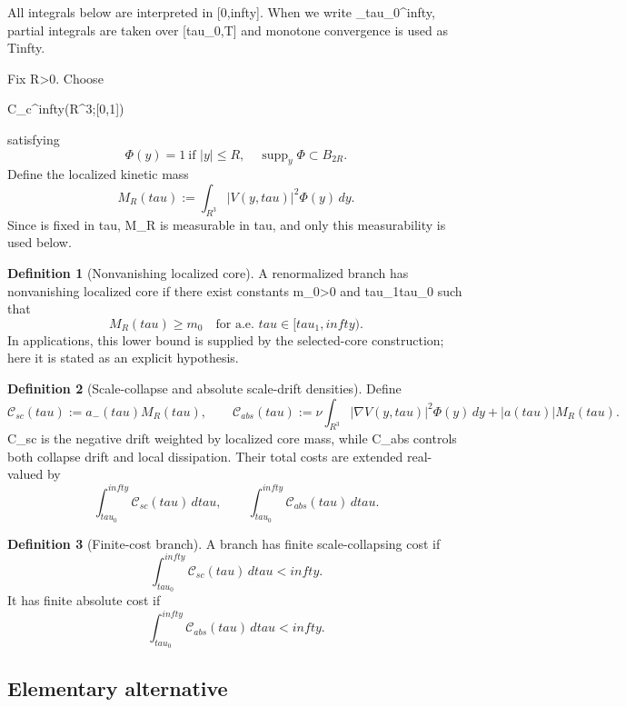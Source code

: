 \documentclass[11pt]{amsart}
\def\({}%
\def\){}%
\def\mathrm#1{#1}%
\def\mathbb#1{#1}%
\def\tau{tau}%
\def\infty{infty}%
\theoremstyle{plain}
\theoremstyle{definition}
\newtheorem{definition}[definition]{Definition}
\theoremstyle{remark}
\begin{document}
All integrals below are interpreted in \([0,\infty]\). When we write
\(\int_{\tau_0}^{\infty}\), partial integrals are taken over \([\tau_0,T]\) and
monotone convergence is used as \(T\to\infty\).

Fix \(R>0\).  Choose
\(
  \Phi\in C_c^\infty(\mathbb R^3;[0,1])
\)
satisfying
\begin{equation}\label{paper5:eq:Phi-properties}
  \Phi(y)=1\ \text{if }|y|\le R,
  \quad
  \operatorname{supp}_y\Phi\subset B_{2R}.
\end{equation}
Define the localized kinetic mass
\[
  M_R(\tau):=\int_{\mathbb R^3}|V(y,\tau)|^2\Phi(y)
  \,dy.
\]
Since \(\Phi\) is fixed in \(\tau\), \(M_R\) is measurable in \(\tau\), and only this
measurability is used below.

\begin{definition}[Nonvanishing localized core]
A renormalized branch has nonvanishing localized core if there exist
constants \(m_0>0\) and \(\tau_1\ge\tau_0\) such that
\[
  M_R(\tau)\ge m_0\quad\text{for a.e. }\tau\in[\tau_1,\infty).
\]
In applications, this lower bound is supplied by the selected-core construction; here it is stated as an explicit hypothesis.
\end{definition}

\begin{definition}[Scale-collapse and absolute scale-drift densities]
Define
\[
  \mathcal C_{\mathrm{sc}}(\tau):=a_-(\tau)M_R(\tau),
  \qquad
  \mathcal C_{\mathrm{abs}}(\tau):=\nu\int_{\mathbb R^3}|\nabla V(y,\tau)|^2\Phi(y)
  \,dy+|a(\tau)|M_R(\tau).
\]
\(\mathcal C_{\mathrm{sc}}\) is the negative drift weighted by localized core mass, while
\(\mathcal C_{\mathrm{abs}}\) controls both collapse drift and local dissipation.
Their total costs are extended real-valued by
\[
  \int_{\tau_0}^{\infty}\mathcal C_{\mathrm{sc}}(\tau)
  \,d\tau,
  \qquad
  \int_{\tau_0}^{\infty}\mathcal C_{\mathrm{abs}}(\tau)
  \,d\tau.
\]
\end{definition}

\begin{definition}[Finite-cost branch]\label{paper5:def:finite-cost-branch}
A branch has finite scale-collapsing cost if
\[
  \int_{\tau_0}^{\infty}\mathcal C_{\mathrm{sc}}(\tau)
  \,d\tau<\infty.
\]
It has finite absolute cost if
\[
  \int_{\tau_0}^{\infty}\mathcal C_{\mathrm{abs}}(\tau)
  \,d\tau<\infty.
\]
\end{definition}

\subsection{Elementary alternative}
\label{paper5:sec:cost}
\end{document}
